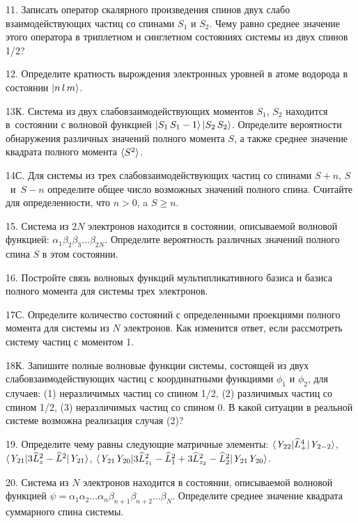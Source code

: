 \par
11. Записать оператор скалярного произведения спинов двух слабо взаимодействующих частиц со спинами $S_1$ и $S_2$. Чему равно среднее значение этого оператора в триплетном и синглетном состояниях системы из двух спинов 1/2?
\par
12. Определите кратность вырождения электронных уровней в атоме водорода в состоянии $\ket{n\,l\,m} $.
\par
13К. Система из двух слабовзаимодействующих моментов $S_1$, $S_2$ находится в~состоянии с волновой функцией $\ket{S_1\,S_1-1}\ket{S_2\,S_2}$. Определите вероятности обнаружения различных значений полного момента $S$, а также среднее значение квадрата полного момента $\braket{S^2}$.
\par
14С. Для системы из трех слабовзаимодействующих частиц со спинами $S + n$, $S$~и~$S - n$ определите общее число возможных значений полного спина. Считайте для определенности, что $n > 0$, a $S \geq n$.
\par
15. Система из $2N$ электронов находится в состоянии, описываемой волновой функцией: $\alpha_1\beta_2\beta_3 \ldots \beta_{2N}$. Определите вероятность различных значений полного спина $S$ в этом состоянии.
\par
16. Постройте связь волновых функций мультипликативного базиса и базиса полного момента для системы трех электронов.
\par
17С. Определите количество состояний с определенными проекциями полного момента для системы из $N$ электронов. Как изменится ответ, если рассмотреть систему частиц с моментом 1.
\par
18К. Запишите полные волновые функции системы, состоящей из двух слабовзаимодействующих частиц с координатными функциями $\phi_1$ и $\phi_2$, для случаев: (1) неразличимых частиц со спином 1/2, (2) различимых частиц со спином 1/2, (3) неразличимых частиц со спином 0. В какой ситуации в реальной системе возможна реализация случая (2)?
\par
19. Определите чему равны следующие матричные элементы: $\braket{\textit{Y}_{22}|\widehat L^4_+|\textit{Y}_{2-2}}$, $\braket{\textit{Y}_{21}|3\widehat L_{z}^2- \widehat L^2|\textit{Y}_{21}}$, $\braket{\textit{Y}_{21}\textit{Y}_{20}|3 \widehat L_{z_1}^2- \widehat L_1^2+3 \widehat L_{z_2}^2- \widehat L_2^2|\textit{Y}_{21}\textit{Y}_{20}}$.
\par
20. Система из $N$ электронов находится в состоянии, описываемой волновой функцией $\psi=\alpha_1\alpha_2 \ldots \alpha_n\beta_{n+1}\beta_{n+2} \ldots \beta_{N}$. Определите среднее значение квадрата суммарного спина системы.
\par
